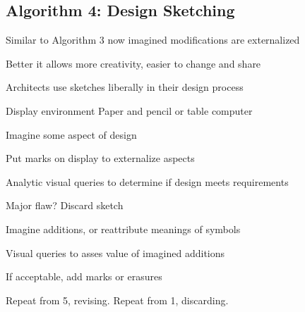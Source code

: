 \begin{mdframed}
\begin{multicols}{2}
\subsection{Algorithm 4: Design Sketching}
\begin{compactdesc}
\item[Similar to Algorithm 3] now imagined modifications are externalized
\item[Better] it allows more creativity, easier to change and share
\item[Architects] use sketches liberally in their design process
\item[Display environment] Paper and pencil or table computer
\end{compactdesc}
\midrule\begin{compactenum}
\item Imagine some aspect of design
\item Put marks on display to externalize aspects
\item Analytic visual queries to determine if design meets requirements
\item Major flaw? Discard sketch
\item Imagine additions, or reattribute meanings of symbols
\item Visual queries to asses value of imagined additions
\item If acceptable, add marks or erasures
\item Repeat from 5, revising. Repeat from 1, discarding.
\end{compactenum}

\end{multicols}\end{mdframed}





